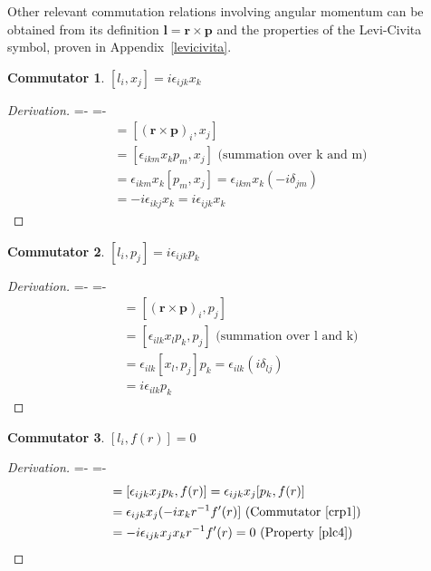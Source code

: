 \documentclass[12pt,a4paper]{report}
\theoremstyle{definition}
\newtheorem{commutator}{Commutator}[section]
\newenvironment{derivation}
  {\renewcommand\qedsymbol{$\square$}\begin{proof}[Derivation]}
  {\end{proof}}
\theoremstyle{remark}
\theoremstyle{remark}
\begin{document}
\begin{appendices}
Other relevant commutation relations involving angular momentum can be obtained from its definition $\textbf{l}=\textbf{r}\times\textbf{p}$ and the properties of the Levi-Civita symbol, proven in Appendix~\ref{levicivita}.

\begin{commutator}\label{cl1}
$[l_i,x_j]=i\epsilon_{ijk}x_k$
\end{commutator} 
\begin{derivation}
\abovedisplayskip=-\baselineskip
\belowdisplayskip=0pt
\abovedisplayshortskip=-\baselineskip
\belowdisplayshortskip=0pt
\begin{align*}
[l_i,x_j] &= [(\textbf{r}\times\textbf{p})_i,x_j] \\
&= [\epsilon_{ikm}x_kp_m,x_j] \text{ (summation over k and m)} \\
&= \epsilon_{ikm}x_k[p_m,x_j] = \epsilon_{ikm}x_k(-i\delta_{jm}) \\
&= -i\epsilon_{ikj}x_k = i\epsilon_{ijk}x_k
\end{align*}
\end{derivation}

\begin{commutator}\label{cl2}
$[l_i,p_j]=i\epsilon_{ijk}p_k$
\end{commutator} 
\begin{derivation}
\abovedisplayskip=-\baselineskip
\belowdisplayskip=0pt
\abovedisplayshortskip=-\baselineskip
\belowdisplayshortskip=0pt
\begin{align*}
[l_i,p_j] &= [(\textbf{r}\times\textbf{p})_i,p_j] \\
&= [\epsilon_{ilk}x_lp_k,p_j] \text{ (summation over l and k)} \\
&= \epsilon_{ilk}[x_l,p_j]p_k = \epsilon_{ilk}(i\delta_{lj}) \\
&= i\epsilon_{ilk}p_k
\end{align*}
\end{derivation}

\begin{commutator}\label{cl3}
$[l_i,f(r)]=0$
\end{commutator} 
\begin{derivation}
\abovedisplayskip=-\baselineskip
\belowdisplayskip=0pt
\abovedisplayshortskip=-\baselineskip
\belowdisplayshortskip=0pt
\begin{align*}
[l_i,f(r)] &= [\epsilon_{ijk}x_jp_k,f(r)] = \epsilon_{ijk}x_j[p_k,f(r)] \\
&= \epsilon_{ijk}x_j(-i x_kr^{-1}f'(r)] \text{ (Commutator~\ref{crp1})} \\
&= -i\epsilon_{ijk}x_jx_kr^{-1}f'(r) = 0 \text{ (Property~\ref{plc4})}
\end{align*}
\end{derivation}


\end{appendices}
\end{document}
